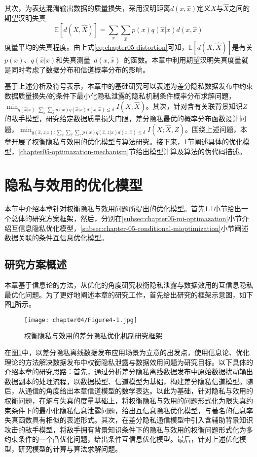 其次，为表达混淆输出数据的质量损失，采用汉明距离$d(x,\hat{x})$定义$X$与$\hat{X}$之间的期望汉明失真
\begin{equation}\label{eq:chapter05-distortion}
	\mathbb{E}\left[d\left(X,\hat{X}\right)\right]=\sum_{x}\sum_{\hat{x}}p(x)q(\hat{x}|x)d(x,\hat{x})
\end{equation}
度量平均的失真程度。由上式\ref{eq:chapter05-distortion}可知，$	\mathbb{E}\left[d\left(X,\hat{X}\right)\right]$是有关$p(x)$、$q(\hat{x}|x)$和失真测量~$d(x,\hat{x})$~的函数。本章中利用期望汉明失真度量就是同时考虑了数据分布和信道概率分布的影响。

基于上述分析及符号表示，本章中的基础研究可以表述为差分隐私数据发布中约束数据质量损失$\delta$的条件下最小化隐私泄露的隐私机制条件概率分布求解问题，$\min_{q(\hat{x}|x):\sum_{x}\sum_{\hat{x}}p(x)q(\hat{x}|x)d(x,\hat{x})\leq \delta}I(X;\hat{X})$。其次，针对含有关联背景知识$Z$的敌手模型，研究给定数据质量损失门限，差分隐私最优的概率分布函数设计问题，$\min_{q(\hat{x},z|x):\sum_{x}\sum_{\hat{x}}\sum_{z}p(x)q(\hat{x},z|x)d(x,\hat{x})\leq  \delta}I(X;\hat{X},Z)$。围绕上述问题，本章开展了权衡隐私与效用的优化模型与算法研究。接下来，\ref{chapter05-optimal-model}节阐述具体的优化模型，\ref{chapter05-optimazation-mechanism}节给出模型计算及算法的伪代码描述。

\section{隐私与效用的优化模型}\label{chapter05-optimal-model}
本节中介绍本章针对权衡隐私与效用问题所提出的优化模型。首先\ref{subsec:chapter05-yjsl}小节给出一个总体的研究方案框架，然后，分别在\ref{subsec:chapter05-mi-optimazation}小节介绍互信息隐私优化模型，\ref{subsec:chapter-05-conditional-mioptimization}小节阐述数据关联的条件互信息优化模型。

\subsection{研究方案概述}\label{subsec:chapter05-yjsl}
本章基于信息论的方法，从优化的角度研究权衡隐私泄露与数据效用的互信息隐私最优化问题。为了更好地阐述本章的研究工作，首先给出研究的框架示意图，如下图\ref{Fig:chapter05-1}所示。
\begin{figure}[htbp]
	\centering
	\texttt{[image: chapter04/Figure4-1.jpg]}
	\caption{权衡隐私与效用的差分隐私优化机制研究框架}
	\label{Fig:chapter05-1}
\end{figure}

在图\ref{Fig:chapter05-1}中，以差分隐私离线数据发布应用场景为立意的出发点，使用信息论、优化理论的方法解决数据发布中权衡隐私泄露与数据效用问题为研究目标。以下具体的介绍本章的研究思路：首先，通过分析差分隐私离线数据发布中原始数据扰动输出数据副本的处理流程，以数据模型、信道模型为基础，构建差分隐私信道模型。随后，从通信的角度给出本章信道模型的数学表达。以此为基础，针对隐私与效用的权衡问题，在熵与失真的度量基础上，将权衡隐私与效用的问题形式化为限失真约束条件下的最小化隐私信息泄露问题，给出互信息隐私优化模型，与著名的信息率失真函数具有相似的表述形式。其次，在差分隐私通信模型中引入含辅助背景知识攻击的敌手模型，将敌手拥有背景知识条件下的隐私与效用的权衡问题形式化为多约束条件的一个凸优化问题，给出条件互信息优化模型。最后，针对上述优化模型，研究模型的计算与算法求解问题。

